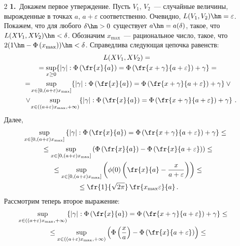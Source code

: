 \begin{multicols}{2}
\noindent
\textbf{1.}\ Докажем первое утверждение.
Пусть  $V_1$, $V_2$~--- случайные величины, вы\-рож\-ден\-ные в точках $a$, $a+\varepsilon$ соответственно.
      Очевидно, $L(V_1, V_2) \hm= \varepsilon$. Покажем, что для любого
       $\delta\hm>0$ существует $a \hm= a(\delta)$, такое, что
      $L(X V_1, X V_2)\hm < \delta$. Обозначим $x_{\max}$~--- рациональное число, такое, что
      $2( 1 \hm- \Phi\left(  x_{\max} \right) )\hm<\delta$. Справедлива следующая  цепочка равенств:
      \begin{multline*}
      L(X V_1, X V_2)= {}\\
      {}=\sup\limits_{x \ge 0}\!
      \left\{|\gamma| : \Phi\left(\fr{x}{a}\right) =
      \Phi\left(\fr{x+\gamma}{a+\varepsilon}\right)+\gamma
      \right\}={}
\\{}
      =\!\sup\limits_{x \in [0,(a+\varepsilon)x_{\max}]}\!
      \left\{|\gamma| : \Phi\left(\fr{x}{a}\right) =
      \Phi\left(\fr{x+\gamma}{a+\varepsilon}\right)+\gamma
      \right\}\vee{}\\
{}
      \vee\!\sup\limits_{x \in \left((a+\varepsilon)x_{\max},+\infty\right)}
      \!\left\{|\gamma| : \Phi\left(\fr{x}{a}\right) =
      \Phi\left(\fr{x+\gamma}{a+\varepsilon}\right)+\gamma
      \right\}\,.\hspace*{-7.91489pt}
      \end{multline*}
      Далее,
      \begin{multline*}
      \!\!\!\sup\limits_{x \in [0,(a+\varepsilon)x_{\max}]}
      \left\{|\gamma| : \Phi\left(\fr{x}{a}\right) =
      \Phi\left(\fr{x+\gamma}{a+\varepsilon}\right)+\gamma
      \right\}\le{}\\
      {}\le
      \sup\limits_{x \in [0,(a+\varepsilon)x_{\max}]}
      \left(
      \Phi\left(\fr{x}{a}\right) -
      \Phi\left(\fr{x }{a+\varepsilon} \right)
      \right)\le{}
\\
  {}    \le
      \sup\limits_{x \in [0,(a+\varepsilon)x_{\max}]}
      \left(       \phi(0)       \left(       \fr{x}{a}  -
      \frac{x }{a+\varepsilon}       \right)
      \right)\le {}\\
      {}\le      \fr{ 1}{\sqrt{2 \pi} }\,\fr{x_{\max}\varepsilon }{a}\,.
      \end{multline*}
      Рассмотрим теперь второе выражение:
      \begin{multline*}
      \hspace*{-3mm}\!\!\sup\limits_{x \in ((a+\varepsilon)x_{\max},+\infty)}\!
      \left\{|\gamma| : \Phi\left(\fr{x}{a}\right) =
      \Phi\left(\fr{x+\gamma}{a+\varepsilon}\right)+\gamma
      \right\} \le{}\\
  {}   \le \sup\limits_{x \in ((a+\varepsilon)x_{\max},+\infty)}
      \left( \Phi\left(\frac{x}{a}\right) -
      \Phi\left(\fr{x }{a+\varepsilon} \right)
      \right) \le {}
      \end{multline*}


\end{multicols}
